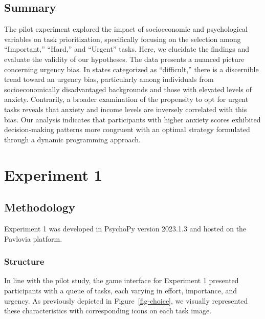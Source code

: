 \documentclass[
]{article}
\begin{document}
\hypertarget{summary}{%
\subsection{Summary}\label{summary}}

The pilot experiment explored the impact of socioeconomic and
psychological variables on task prioritization, specifically focusing on
the selection among ``Important,'' ``Hard,'' and ``Urgent'' tasks. Here,
we elucidate the findings and evaluate the validity of our hypotheses.
The data presents a nuanced picture concerning urgency bias. In states
categorized as ``difficult,'' there is a discernible trend toward an
urgency bias, particularly among individuals from socioeconomically
disadvantaged backgrounds and those with elevated levels of anxiety.
Contrarily, a broader examination of the propensity to opt for urgent
tasks reveals that anxiety and income levels are inversely correlated
with this bias. Our analysis indicates that participants with higher
anxiety scores exhibited decision-making patterns more congruent with an
optimal strategy formulated through a dynamic programming approach.

\hypertarget{experiment-1}{%
\section{Experiment 1}\label{experiment-1}}

\hypertarget{methodology-1}{%
\subsection{Methodology}\label{methodology-1}}

Experiment 1 was developed in PsychoPy version 2023.1.3 and hosted on
the Pavlovia platform.

\hypertarget{structure-1}{%
\subsubsection{Structure}\label{structure-1}}

In line with the pilot study, the game interface for Experiment 1
presented participants with a queue of tasks, each varying in effort,
importance, and urgency. As previously depicted in
Figure~\ref{fig-choice}, we visually represented these characteristics
with corresponding icons on each task image.
\end{document}
